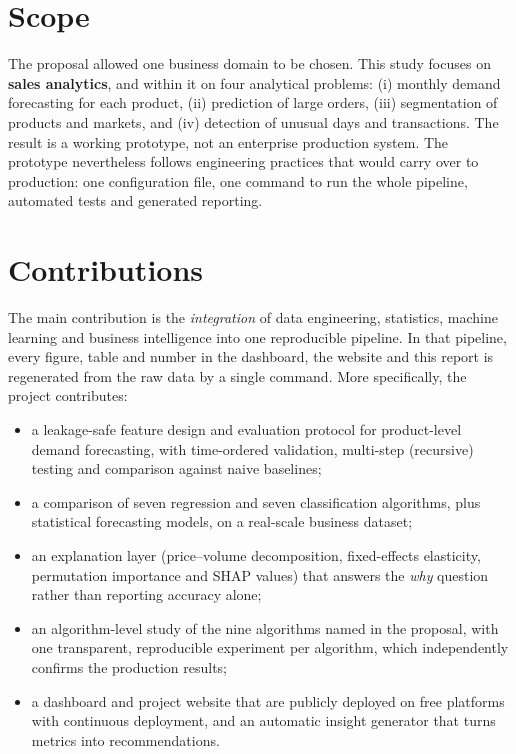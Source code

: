 \section{Scope}
The proposal allowed one business domain to be chosen. This study focuses on \textbf{sales analytics}, and
within it on four analytical problems: (i) monthly demand forecasting for each product, (ii) prediction of
large orders, (iii) segmentation of products and markets, and (iv) detection of unusual days and transactions.
The result is a working prototype, not an enterprise production system. The prototype nevertheless follows
engineering practices that would carry over to production: one configuration file, one command to run the
whole pipeline, automated tests and generated reporting.

\section{Contributions}
The main contribution is the \emph{integration} of data engineering, statistics, machine learning and business
intelligence into one reproducible pipeline. In that pipeline, every figure, table and number in the dashboard,
the website and this report is regenerated from the raw data by a single command. More specifically, the
project contributes:
\begin{itemize}
  \item a leakage-safe feature design and evaluation protocol for product-level demand forecasting, with
        time-ordered validation, multi-step (recursive) testing and comparison against naive baselines;
  \item a comparison of seven regression and seven classification algorithms, plus statistical forecasting
        models, on a real-scale business dataset;
  \item an explanation layer (price--volume decomposition, fixed-effects elasticity, permutation importance and
        SHAP values) that answers the \emph{why} question rather than reporting accuracy alone;
  \item an algorithm-level study of the nine algorithms named in the proposal, with one transparent,
        reproducible experiment per algorithm, which independently confirms the production results;
  \item a dashboard and project website that are publicly deployed on free platforms with continuous
        deployment, and an automatic insight generator that turns metrics into recommendations.
\end{itemize}

